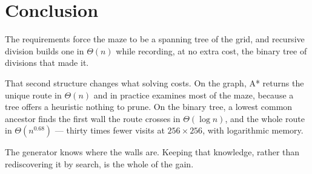 \section{Conclusion}
\label{sec:conclusion}

The requirements force the maze to be a spanning tree of the grid, and
recursive division builds one in $\Theta(n)$ while recording, at no extra cost,
the binary tree of divisions that made it.

That second structure changes what solving costs. On the graph, A* returns the
unique route in $\Theta(n)$ and in practice examines most of the maze, because
a tree offers a heuristic nothing to prune. On the binary tree, a lowest common
ancestor finds the first wall the route crosses in $\Theta(\log n)$, and the
whole route in $\Theta(n^{0.68})$ --- thirty times fewer visits at
$256\times256$, with logarithmic memory.

The generator knows where the walls are. Keeping that knowledge, rather than
rediscovering it by search, is the whole of the gain.
